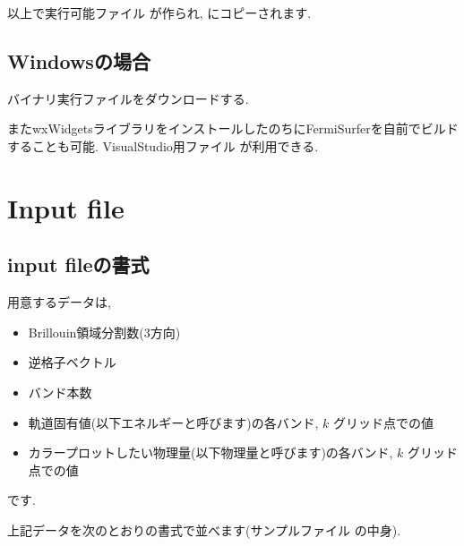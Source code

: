\documentclass[letterpaper,10pt,dvipdfmx,openany]{sphinxmanual}
\begin{document}
\sphinxAtStartPar
以上で実行可能ファイル  が作られ,
 にコピーされます.


\section{Windowsの場合}
\label{\detokenize{install:windows}}
\sphinxAtStartPar
バイナリ実行ファイルをダウンロードする.

\sphinxAtStartPar
またwxWidgetsライブラリをインストールしたのちにFermiSurferを自前でビルドすることも可能.
VisualStudio用ファイル  が利用できる.


\chapter{Input file}
\label{\detokenize{input:input-file}}\label{\detokenize{input:input}}\label{\detokenize{input::doc}}

\section{input fileの書式}
\label{\detokenize{input:id1}}
\sphinxAtStartPar
用意するデータは,
\begin{itemize}
\item {} 
\sphinxAtStartPar
Brillouin領域分割数(3方向)

\item {} 
\sphinxAtStartPar
逆格子ベクトル

\item {} 
\sphinxAtStartPar
バンド本数

\item {} 
\sphinxAtStartPar
軌道固有値(以下エネルギーと呼びます)の各バンド,  \(k\) グリッド点での値

\item {} 
\sphinxAtStartPar
カラープロットしたい物理量(以下物理量と呼びます)の各バンド,
\(k\) グリッド点での値

\end{itemize}

\sphinxAtStartPar
です.

\sphinxAtStartPar
上記データを次のとおりの書式で並べます(サンプルファイル
 の中身).
\end{document}
